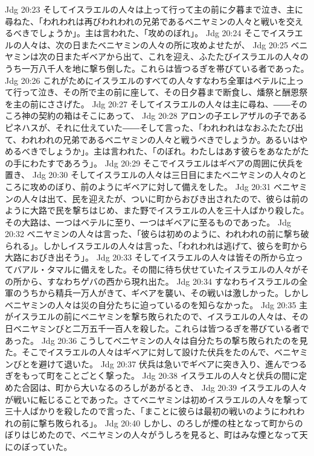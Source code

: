 Jdg 20:23  そしてイスラエルの人々は上って行って主の前に夕暮まで泣き、主に尋ねた、「われわれは再びわれわれの兄弟であるベニヤミンの人々と戦いを交えるべきでしょうか」。主は言われた、「攻めのぼれ」。
Jdg 20:24  そこでイスラエルの人々は、次の日またベニヤミンの人々の所に攻めよせたが、
Jdg 20:25  ベニヤミンは次の日またギベアから出て、これを迎え、ふたたびイスラエルの人々のうち一万八千人を地に撃ち倒した。これらは皆つるぎを帯びている者であった。
Jdg 20:26  これがためにイスラエルのすべての人々すなわち全軍はベテルに上って行って泣き、その所で主の前に座して、その日夕暮まで断食し、燔祭と酬恩祭を主の前にささげた。
Jdg 20:27  そしてイスラエルの人々は主に尋ね、――そのころ神の契約の箱はそこにあって、
Jdg 20:28  アロンの子エレアザルの子であるピネハスが、それに仕えていた――そして言った、「われわれはなおふたたび出て、われわれの兄弟であるベニヤミンの人々と戦うべきでしょうか。あるいはやめるべきでしょうか」。主は言われた、「のぼれ。わたしはあす彼らをあなたがたの手にわたすであろう」。
Jdg 20:29  そこでイスラエルはギベアの周囲に伏兵を置き、
Jdg 20:30  そしてイスラエルの人々は三日目にまたベニヤミンの人々のところに攻めのぼり、前のようにギベアに対して備えをした。
Jdg 20:31  ベニヤミンの人々は出て、民を迎えたが、ついに町からおびき出されたので、彼らは前のように大路で民を撃ちはじめ、また野でイスラエルの人を三十人ばかり殺した。その大路は、一つはベテルに至り、一つはギベアに至るものであった。
Jdg 20:32  ベニヤミンの人々は言った、「彼らは初めのように、われわれの前に撃ち破られる」。しかしイスラエルの人々は言った、「われわれは逃げて、彼らを町から大路におびき出そう」。
Jdg 20:33  そしてイスラエルの人々は皆その所から立ってバアル・タマルに備えをした。その間に待ち伏せていたイスラエルの人々がその所から、すなわちゲバの西から現れ出た。
Jdg 20:34  すなわちイスラエルの全軍のうちから精兵一万人がきて、ギベアを襲い、その戦いは激しかった。しかしベニヤミンの人々は災の自分たちに迫っているのを知らなかった。
Jdg 20:35  主がイスラエルの前にベニヤミンを撃ち敗られたので、イスラエルの人々は、その日ベニヤミンびと二万五千一百人を殺した。これらは皆つるぎを帯びている者であった。
Jdg 20:36  こうしてベニヤミンの人々は自分たちの撃ち敗られたのを見た。そこでイスラエルの人々はギベアに対して設けた伏兵をたのんで、ベニヤミンびとを避けて退いた。
Jdg 20:37  伏兵は急いでギベアに突き入り、進んでつるぎをもって町をことごとく撃った。
Jdg 20:38  イスラエルの人々と伏兵の間に定めた合図は、町から大いなるのろしがあがるとき、
Jdg 20:39  イスラエルの人々が戦いに転じることであった。さてベニヤミンは初めイスラエルの人々を撃って三十人ばかりを殺したので言った、「まことに彼らは最初の戦いのようにわれわれの前に撃ち敗られる」。
Jdg 20:40  しかし、のろしが煙の柱となって町からのぼりはじめたので、ベニヤミンの人々がうしろを見ると、町はみな煙となって天にのぼっていた。
